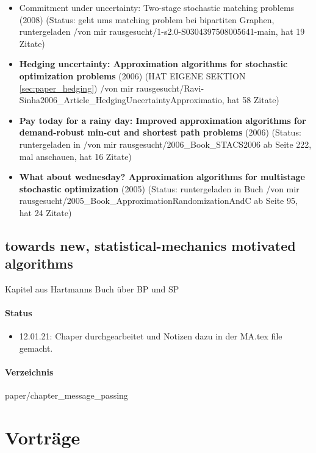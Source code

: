 \documentclass[paper=a4,10pt]{scrartcl}
\begin{document}
\begin{itemize}
\item  Commitment under uncertainty: Two-stage stochastic matching problems (2008) (Status: geht ums matching problem bei bipartiten Graphen, runtergeladen /von mir rausgesucht/1-s2.0-S0304397508005641-main, hat 19 Zitate)
\item  \textbf{Hedging uncertainty: Approximation algorithms for stochastic optimization problems} (2006) (HAT EIGENE SEKTION \ref{sec:paper_hedging}) /von mir rausgesucht/Ravi-Sinha2006\_Article\_HedgingUncertaintyApproximatio, hat 58 Zitate)
\item  \textbf{Pay today for a rainy day: Improved approximation algorithms for demand-robust min-cut and shortest path problems} (2006) (Status: runtergeladen in /von mir rausgesucht/2006\_Book\_STACS2006 ab Seite 222, mal anschauen, hat 16 Zitate)
\item  \textbf{What about wednesday? Approximation algorithms for multistage stochastic optimization} (2005) (Status: runtergeladen in Buch /von mir rausgesucht/2005\_Book\_ApproximationRandomizationAndC ab Seite 95, hat 24 Zitate)
\end{itemize}

\subsection{towards new, statistical-mechanics motivated algorithms}
Kapitel aus Hartmanns Buch über BP und SP

\paragraph{Status}
\begin{itemize}
\item 12.01.21: Chaper durchgearbeitet und Notizen dazu in der MA.tex file gemacht.
\end{itemize}
\paragraph{Verzeichnis} paper/chapter\_message\_passing

\section{Vorträge}
\end{document}
